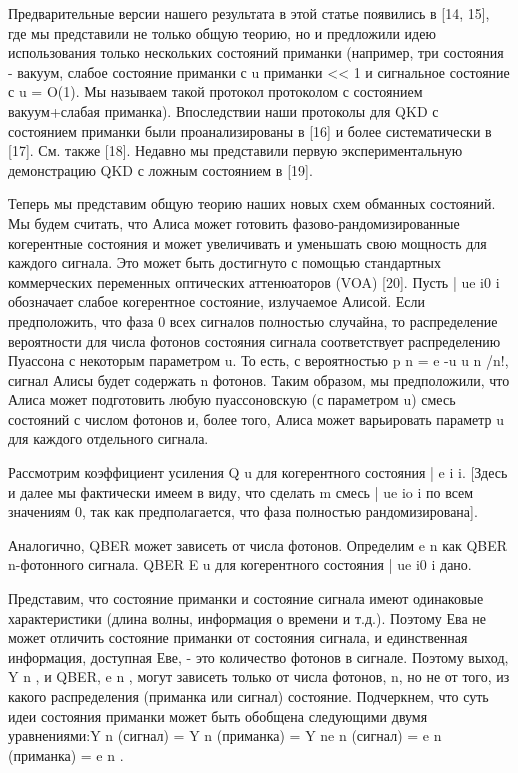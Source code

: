 Предварительные версии нашего результата в этой статье появились в [14, 15], где мы представили не только общую теорию, но и предложили идею использования только нескольких состояний приманки (например, три состояния - вакуум, слабое состояние приманки с u приманки << 1 и сигнальное состояние с u = O(1). Мы называем такой протокол протоколом с состоянием вакуум+слабая приманка). Впоследствии наши протоколы для QKD с состоянием приманки были проанализированы в [16] и более систематически в [17]. См. также [18]. Недавно мы представили первую экспериментальную демонстрацию QKD с ложным состоянием в [19].

Теперь мы представим общую теорию наших новых схем обманных состояний. Мы будем считать, что Алиса может готовить фазово-рандомизированные когерентные состояния и может увеличивать и уменьшать свою мощность для каждого сигнала. Это может быть достигнуто с помощью стандартных коммерческих переменных оптических аттенюаторов (VOA) [20]. Пусть | ue i0 i обозначает слабое когерентное состояние, излучаемое Алисой. Если предположить, что фаза 0 всех сигналов полностью случайна, то распределение вероятности для числа фотонов состояния сигнала соответствует распределению Пуассона с некоторым параметром u. То есть, с вероятностью p n = e -u u n /n!, сигнал Алисы будет содержать n фотонов. Таким образом, мы предположили, что Алиса может подготовить любую пуассоновскую (с параметром u) смесь состояний с числом фотонов и, более того, Алиса может варьировать параметр u для каждого отдельного сигнала.

Рассмотрим коэффициент усиления Q u для когерентного состояния
| e i i. [Здесь и далее мы фактически имеем в виду, что
сделать m смесь | ue io i по всем значениям 0, так как предполагается, что фаза полностью рандомизирована].

Аналогично, QBER может зависеть от числа фотонов. Определим e n как QBER n-фотонного сигнала. QBER E u для когерентного состояния | ue i0 i дано.

Представим, что состояние приманки и состояние сигнала имеют одинаковые характеристики (длина волны, информация о времени и т.д.). Поэтому Ева не может отличить состояние приманки от состояния сигнала, и единственная информация, доступная Еве, - это количество фотонов в сигнале. Поэтому выход, Y n , и QBER, e n , могут зависеть только от числа фотонов, n, но не от того, из какого распределения (приманка или сигнал) состояние. Подчеркнем, что суть идеи состояния приманки может быть обобщена следующими двумя уравнениями:Y n (сигнал) = Y n (приманка) = Y ne n (сигнал) = e n (приманка) = e n .

